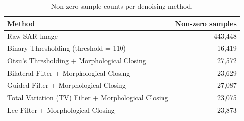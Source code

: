 \begin{table}[H]
    \centering
    \caption{Non-zero sample counts per denoising method.}
    \begin{tabular}{lr}
        \toprule
        Method & Non-zero samples \\
        \midrule
        Raw SAR Image & 443,448 \\
        Binary Thresholding (threshold = 110) & 16,419 \\
        Otsu's Thresholding + Morphological Closing & 27,572 \\
        Bilateral Filter + Morphological Closing & 23,629 \\
        Guided Filter + Morphological Closing & 27,087 \\
        Total Variation (TV) Filter + Morphological Closing & 23,075 \\
        Lee Filter + Morphological Closing & 23,873 \\
        \bottomrule
    \end{tabular}
\end{table}
